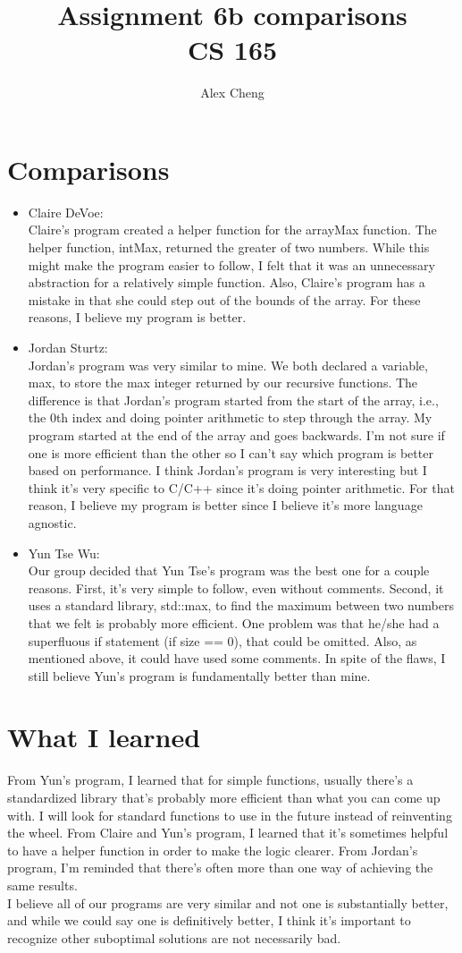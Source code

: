\documentclass[]{article}
\title{Assignment 6b comparisons \\ CS 165}
\author{Alex Cheng}
\begin{document}
\maketitle

\section{Comparisons}
\begin{itemize}
	\item Claire DeVoe:\\
	Claire's program created a helper function for the arrayMax function. The helper function, intMax, returned the greater of two numbers. While this might make the program easier to follow, I felt that it was an unnecessary abstraction for a relatively simple function. Also, Claire's program has a mistake in that she could step out of the bounds of the array. For these reasons, I believe my program is better.
	\\
	\item Jordan Sturtz:\\
	Jordan's program was very similar to mine. We both declared a variable, max, to store the max integer returned by our recursive functions. The difference is that Jordan's program started from the start of the array, i.e., the 0th index and doing pointer arithmetic to step through the array. My program started at the end of the array and goes backwards. I'm not sure if one is more efficient than the other so I can't say which program is better based on performance. I think Jordan's program is very interesting but I think it's very specific to C/C++ since it's doing pointer arithmetic. For that reason, I believe my program is better since I believe it's more language agnostic.
	\\
	\item  Yun Tse Wu:\\
	Our group decided that Yun Tse's program was the best one for a couple reasons. First, it's very simple to follow, even without comments. Second, it uses a standard library, std::max, to find the maximum between two numbers that we felt is probably more efficient. One problem was that he/she had a superfluous if statement (if size == 0), that could be omitted. Also, as mentioned above, it could have used some comments. In spite of the flaws, I still believe Yun's program is fundamentally better than mine.
\end{itemize}
\section{What I learned}
 From Yun's program, I learned that for simple functions, usually there's a standardized library that's probably more efficient than what you can come up with. I will look for standard functions to use in the future instead of reinventing the wheel. From Claire and Yun's program, I learned that it's sometimes helpful to have a helper function in order to make the logic clearer. From Jordan's program, I'm reminded that there's often more than one way of achieving the same results. \\
 
I believe all of our programs are very similar and not one is substantially better, and while we could say one is definitively better, I think it's important to recognize other suboptimal solutions are not necessarily bad.
\end{document}
